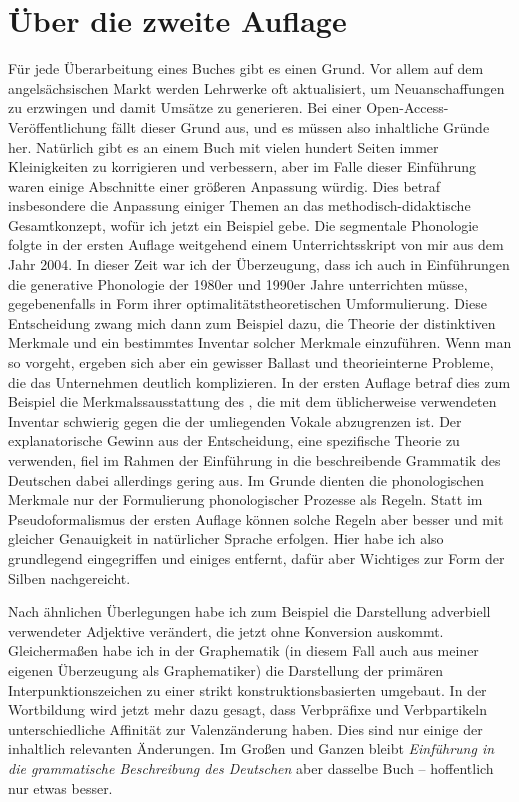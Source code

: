 \section*{Über die zweite Auflage}

Für jede Überarbeitung eines Buches gibt es einen Grund.
Vor allem auf dem angelsächsischen Markt werden Lehrwerke oft aktualisiert, um Neuanschaffungen zu erzwingen und damit Umsätze zu generieren.
Bei einer Open-Access-Veröffentlichung fällt dieser Grund aus, und es müssen also inhaltliche Gründe her.
Natürlich gibt es an einem Buch mit vielen hundert Seiten immer Kleinigkeiten zu korrigieren und verbessern, aber im Falle dieser Einführung waren einige Abschnitte einer größeren Anpassung würdig.
Dies betraf insbesondere die Anpassung einiger Themen an das methodisch-didaktische Gesamtkonzept, wofür ich jetzt ein Beispiel gebe.
Die segmentale Phonologie folgte in der ersten Auflage weitgehend einem Unterrichtsskript von mir aus dem Jahr 2004.
In dieser Zeit war ich der Überzeugung, dass ich auch in Einführungen die generative Phonologie der 1980er und 1990er Jahre unterrichten müsse, gegebenenfalls in Form ihrer optimalitätstheoretischen Umformulierung.
Diese Entscheidung zwang mich dann zum Beispiel dazu, die Theorie der distinktiven Merkmale und ein bestimmtes Inventar solcher Merkmale einzuführen.
Wenn man so vorgeht, ergeben sich aber ein gewisser Ballast und theorieinterne Probleme, die das Unternehmen deutlich komplizieren.
In der ersten Auflage betraf dies zum Beispiel die Merkmalssausstattung des , die mit dem üblicherweise verwendeten Inventar schwierig gegen die der umliegenden Vokale abzugrenzen ist.
Der explanatorische Gewinn aus der Entscheidung, eine spezifische Theorie zu verwenden, fiel im Rahmen der Einführung in die beschreibende Grammatik des Deutschen dabei allerdings gering aus.
Im Grunde dienten die phonologischen Merkmale nur der Formulierung phonologischer Prozesse als Regeln.
Statt im Pseudoformalismus der ersten Auflage können solche Regeln aber besser und mit gleicher Genauigkeit in natürlicher Sprache erfolgen.
Hier habe ich also grundlegend eingegriffen und einiges entfernt, dafür aber Wichtiges zur Form der Silben nachgereicht.

Nach ähnlichen Überlegungen habe ich zum Beispiel die Darstellung adverbiell verwendeter Adjektive verändert, die jetzt ohne Konversion auskommt.
Gleichermaßen habe ich in der Graphematik (in diesem Fall auch aus meiner eigenen Überzeugung als Graphematiker) die Darstellung der primären Interpunktionszeichen zu einer strikt konstruktionsbasierten umgebaut.
In der Wortbildung wird jetzt mehr dazu gesagt, dass Verbpräfixe und Verbpartikeln unterschiedliche Affinität zur Valenzänderung haben.
Dies sind nur einige der inhaltlich relevanten Änderungen.
Im Großen und Ganzen bleibt \textit{Einführung in die grammatische Beschreibung des Deutschen} aber dasselbe Buch -- hoffentlich nur etwas besser.

